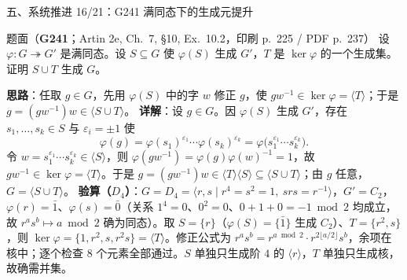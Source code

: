 \documentclass[aspectratio=169,10pt,fontset=none]{ctexbeamer}
\newcommand{\ex}[1]{\textcolor{accent}{\footnotesize\bfseries #1}}
\newcommand{\key}[1]{\textcolor{ink}{\bfseries #1}}
\begin{document}
\begin{frame}[t]{五、系统推进 16/21：G241 满同态下的生成元提升}
\label{ex:G241}
\scriptsize
\begin{block}{\footnotesize 题面（\ex{G241}；Artin 2e, Ch.~7, \S10, Ex.~10.2，印刷 p.~225 / PDF p.~237）}
设 $\varphi:G\twoheadrightarrow G'$ 是满同态。设 $S\subseteq G$ 使 $\varphi(S)$ 生成 $G'$，$T$ 是 $\ker\varphi$ 的一个生成集。证明 $S\cup T$ 生成 $G$。
\end{block}
\key{思路}：任取 $g\in G$，先用 $\varphi(S)$ 中的字 $w$ 修正 $g$，使 $gw^{-1}\in\ker\varphi=\langle T\rangle$；于是 $g=(gw^{-1})w\in\langle S\cup T\rangle$。
\key{详解}：设 $g\in G$。因 $\varphi(S)$ 生成 $G'$，存在 $s_1,\dots,s_k\in S$ 与 $\varepsilon_i=\pm1$ 使
\[ \varphi(g)=\varphi(s_1)^{\varepsilon_1}\cdots\varphi(s_k)^{\varepsilon_k}=\varphi\bigl(s_1^{\varepsilon_1}\cdots s_k^{\varepsilon_k}\bigr). \]
令 $w=s_1^{\varepsilon_1}\cdots s_k^{\varepsilon_k}\in\langle S\rangle$，则 $\varphi(gw^{-1})=\varphi(g)\varphi(w)^{-1}=1$，故 $gw^{-1}\in\ker\varphi=\langle T\rangle$。于是 $g=(gw^{-1})w\in\langle T\rangle\langle S\rangle\subseteq\langle S\cup T\rangle$；由 $g$ 任意，$G=\langle S\cup T\rangle$。
\key{验算（$D_4$）}：$G=D_4=\langle r,s\mid r^4=s^2=1,\ srs=r^{-1}\rangle$，$G'=C_2$，$\varphi(r)=\bar1$、$\varphi(s)=\bar0$（关系 $1^4=0$、$0^2=0$、$0+1+0=-1\bmod2$ 均成立，故 $r^as^b\mapsto a\bmod2$ 确为同态）。取 $S=\{r\}$（$\varphi(S)=\{\bar1\}$ 生成 $C_2$）、$T=\{r^2,s\}$，则 $\ker\varphi=\{1,r^2,s,r^2s\}=\langle T\rangle$。修正公式为 $r^as^b=r^{a\bmod2}\cdot r^{2\lfloor a/2\rfloor}s^b$，余项在核中；逐个检查 $8$ 个元素全部通过。$S$ 单独只生成阶 $4$ 的 $\langle r\rangle$，$T$ 单独只生成核，故确需并集。
\end{frame}
\end{document}
